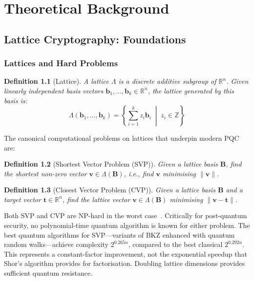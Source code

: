 \documentclass[12pt,a4paper]{report}
\newtheorem{definition}{Definition}[chapter]
\begin{document}
\chapter{Theoretical Background}

\section{Lattice Cryptography: Foundations}

\subsection{Lattices and Hard Problems}

\begin{definition}[Lattice]
A lattice $\Lambda$ is a discrete additive subgroup of $\mathbb{R}^n$. Given linearly
independent basis vectors $\mathbf{b}_1, \ldots, \mathbf{b}_k \in \mathbb{R}^n$, the
lattice generated by this basis is:
\[
\Lambda(\mathbf{b}_1, \ldots, \mathbf{b}_k) = \left\{ \sum_{i=1}^{k} z_i \mathbf{b}_i \;\middle|\; z_i \in \mathbb{Z} \right\}
\]
\end{definition}

The canonical computational problems on lattices that underpin modern PQC are:

\begin{definition}[Shortest Vector Problem (SVP)]
Given a lattice basis $\mathbf{B}$, find the shortest non-zero vector $\mathbf{v} \in \Lambda(\mathbf{B})$,
i.e., find $\mathbf{v}$ minimising $\|\mathbf{v}\|$.
\end{definition}

\begin{definition}[Closest Vector Problem (CVP)]
Given a lattice basis $\mathbf{B}$ and a target vector $\mathbf{t} \in \mathbb{R}^n$,
find the lattice vector $\mathbf{v} \in \Lambda(\mathbf{B})$ minimising $\|\mathbf{v} - \mathbf{t}\|$.
\end{definition}

Both SVP and CVP are NP-hard in the worst case~\cite{peikert2016}. Critically for
post-quantum security, no polynomial-time quantum algorithm is known for either
problem. The best quantum algorithms for SVP---variants of BKZ enhanced with quantum
random walks---achieve complexity $2^{0.265n}$, compared to the best classical $2^{0.292n}$.
This represents a constant-factor improvement, not the exponential speedup that
Shor's algorithm provides for factorisation. Doubling lattice dimensions provides
sufficient quantum resistance.
\end{document}
